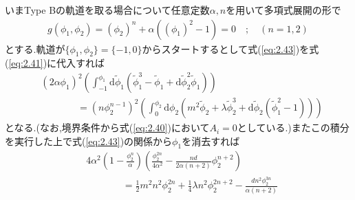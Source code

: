 \documentclass[dvipdfmx,11pt,a4paper,oneside,openany]{jsbook}
\begin{document}
いまType Bの軌道を取る場合について任意定数$\alpha,n$を用いて多項式展開の形で
\begin{align}
    g\left(\phi_{1}, \phi_{2}\right)=\left(\phi_{2}\right)^{n}+\alpha\left(\left(\phi_{1}\right)^{2}-1\right)=0\quad ; \quad (n=1,2)\label{eq:2.43}
\end{align}
とする.軌道が$\{\phi_1,\phi_2\}=\{-1,0\}$からスタートするとして式(\ref{eq:2.43})を式(\ref{eq:2.41})に代入すれば
\begin{align}
     & \left(2 \alpha \phi_{1}\right)^{2}\left(\int_{-1}^{\phi_{1}} \mathrm{d} \tilde{\phi}_{1}\left(\tilde{\phi}_{1}^{3}-\tilde{\phi}_{1}+\mathrm{d} \tilde{\phi}_{2}^{2} \tilde{\phi}_{1}\right)\right)\nonumber                                                \\
     & \qquad\ \ \ \ \ \ \ \ =\left(n \phi_{2}^{n-1}\right)^{2}\left(\int_{0}^{\phi_{2}} \mathrm{d} \phi_{2}\left(m^{2} \tilde{\phi}_{2}+\lambda \tilde{\phi}_{2}^{3}+\mathrm{d} \tilde{\phi}_{2}\left(\tilde{\phi}_{1}^{2}-1\right)\right)\right)\label{eq:2.44}
\end{align}
となる.(なお,境界条件から式(\ref{eq:2.40})において$A_i=0$としている.)またこの積分を実行した上で式(\ref{eq:2.43})の関係から$\phi_1$を消去すれば
\begin{align}
     & 4 \alpha^{2}\left(1-\frac{\phi_{2}^{n}}{\alpha}\right)\left(\frac{\phi_{2}^{2 n}}{4 \alpha^{2}}-\frac{n d}{2 \alpha(n+2)} \phi_{2}^{n+2}\right)\nonumber           \\
     & \qquad\ \ \ \ \ \ \ \ =\frac{1}{2} m^{2} n^{2} \phi_{2}^{2 n}+\frac{1}{4} \lambda n^{2} \phi_{2}^{2 n+2}-\frac{d n^{2} \phi_{2}^{3 n}}{\alpha(n+2)}\label{eq:2.45}
\end{align}
\end{document}
